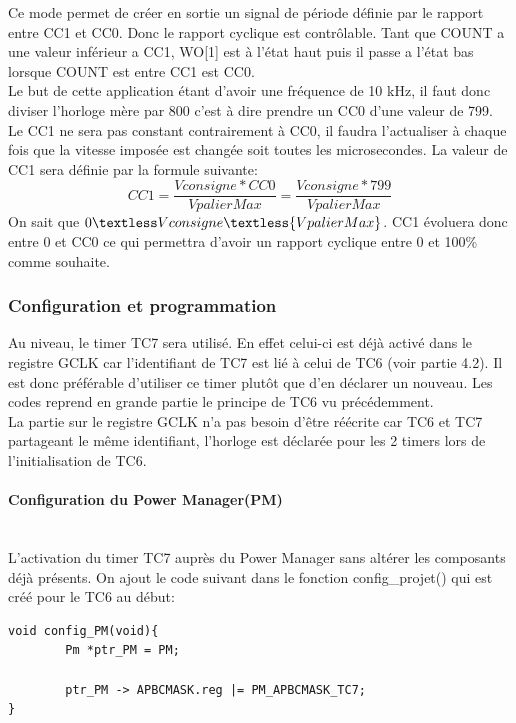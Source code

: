 \documentclass[a4paper]{article}
\begin{document}
    Ce mode permet de créer en sortie un signal de période définie par le rapport entre CC1 et CC0. Donc le rapport cyclique est contrôlable. Tant que COUNT a une valeur inférieur a CC1, WO[1] est à l'état haut puis il passe a l'état bas lorsque COUNT est entre CC1 est CC0. \\
    Le but de cette application étant d'avoir une fréquence de 10 kHz, il faut donc diviser l'horloge mère par 800 c'est à dire prendre un CC0 d'une valeur de 799. \\
    Le CC1 ne sera pas constant contrairement à CC0, il faudra l'actualiser à chaque fois que la vitesse imposée est changée soit toutes les microsecondes. La valeur de CC1 sera définie par la formule suivante:
    \begin{equation}
		CC1 = {\frac {Vconsigne*CC0} {VpalierMax}}={\frac {Vconsigne*799} {VpalierMax}}
	\end{equation}
    On sait que $0 \textless Vconsigne \textless {VpalierMax}$. CC1 évoluera donc entre 0 et CC0 ce qui permettra d'avoir un rapport cyclique entre 0 et 100\% comme souhaite.\\
    \subsubsection{Configuration et programmation}
    Au niveau, le timer TC7 sera utilisé. En effet celui-ci est déjà activé dans le registre GCLK car l’identifiant de TC7 est lié à celui de TC6 (voir partie 4.2). Il est donc préférable d’utiliser ce timer plutôt que d’en déclarer un nouveau. Les codes reprend en grande partie le principe de TC6 vu précédemment. \\
    La partie sur le registre GCLK n’a pas besoin d’être réécrite car TC6 et TC7 partageant le même identifiant, l’horloge est déclarée pour les 2 timers lors de l’initialisation de TC6. \\
    \paragraph{Configuration du Power Manager(PM)} ~~\\
    L’activation du timer TC7 auprès du Power Manager sans altérer les composants déjà présents. On ajout le code suivant dans le fonction config\_projet() qui est créé pour le TC6 au début:
    \begin{lstlisting}[style=CStyle]
void config_PM(void){
	    Pm *ptr_PM = PM;

	    ptr_PM -> APBCMASK.reg |= PM_APBCMASK_TC7;
}
    \end{lstlisting}
\end{document}
